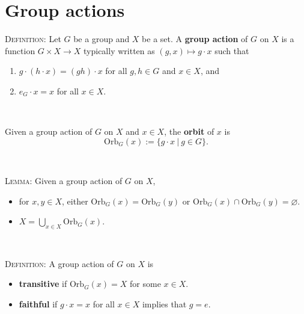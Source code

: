 \documentclass[12pt]{amsart}
\newcommand{\showsol}[1]{\def\displaysol{#1}}
\begin{document}
\showsol{0}
	
	\thispagestyle{empty}
	
	\section*{Group actions}
	
	

\begin{framed}

\textsc{Definition:} Let $G$ be a group and $X$ be a set. A \textbf{group action} of $G$ on $X$ is a function $G\times X \to X$ typically written as $(g,x)\mapsto g \cdot x$ such that
\begin{enumerate}
\item $g\cdot (h \cdot x) = (gh) \cdot x$ for all $g,h\in G$ and $x\in X$, and
\item $e_G \cdot x = x$ for all $x\in X$.
\end{enumerate}

\

Given a group action of $G$ on $X$ and $x\in X$, the \textbf{orbit} of $x$ is 
\[ \mathrm{Orb}_G(x) := \{ g\cdot x \ | \ g\in G\}.\]

\

\textsc{Lemma:} Given a group action of $G$ on $X$,
\begin{itemize}
\item for $x,y\in X$, either $\mathrm{Orb}_G(x) = \mathrm{Orb}_G(y)$ or  $\mathrm{Orb}_G(x) \cap \mathrm{Orb}_G(y)=\varnothing$.
\item $X= \bigcup_{x\in X} \mathrm{Orb}_G(x)$.
\end{itemize}

\

\textsc{Definition:} A group action of $G$ on $X$ is
\begin{itemize}
\item  \textbf{transitive} if $\mathrm{Orb}_G(x) = X$ for some $x\in X$.
\item \textbf{faithful} if $g \cdot x = x$ for all $x\in X$ implies that $g=e$.
\end{itemize}
\end{framed}
\end{document}
